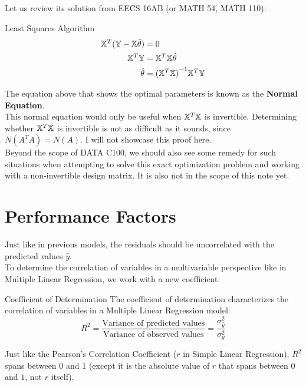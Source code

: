 Let us review its solution from EECS 16AB (or MATH 54, MATH 110):
\begin{ln-derive}{Least Squares Algorithm}{}
    \begin{align*}
        \mathbb{X}^T (\mathbb{Y} - \mathbb{X} \hat{\theta}) &= 0 \\
        \mathbb{X}^T\mathbb{Y} &= \mathbb{X}^T\mathbb{X} \hat{\theta} \\
        \hat{\theta} &= {(\mathbb{X}^T\mathbb{X})}^{-1} \mathbb{X}^T\mathbb{Y}
    \end{align*}
\end{ln-derive}
The equation above that shows the optimal parameters is known as the \textbf{Normal Equation}. \\
This normal equation would only be useful when $\mathbb{X}^T \mathbb{X}$ is invertible. Determining whether $\mathbb{X}^T \mathbb{X}$ is invertible is not as difficult as it sounds, since $N(A^T A) = N(A)$. I will not showcase this proof here. \\
Beyond the scope of DATA C100, we should also see some remedy for such situations when attempting to solve this exact optimization problem and working with a non-invertible design matrix. It is also not in the scope of this note yet.

\section{Performance Factors}
Just like in previous models, the residuals should be uncorrelated with the predicted values $\hat{y}$. \\
To determine the correlation of variables in a multivariable perspective like in Multiple Linear Regression, we work with a new coefficient:
\begin{ln-define}{Coefficient of Determination}{}
    The coefficient of determination characterizes the correlation of variables in a Multiple Linear Regression model:
    \[R^2 = \frac{\text{Variance of predicted values}}{\text{Variance of observed values}} = \frac{\sigma_{\hat{y}}^2}{\sigma_y^2}\]
\end{ln-define}
Just like the Pearson's Correlation Coefficient ($r$ in Simple Linear Regression), $R^2$ spans between $0$ and $1$ (except it is the absolute value of $r$ that spans between $0$ and $1$, not $r$ itself).
